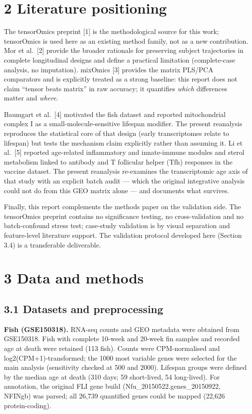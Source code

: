 \documentclass[
]{article}
\begin{document}
\section{2 Literature positioning}\label{literature-positioning}

The tensorOmics preprint {[}1{]} is the methodological source for this
work; tensorOmics is used here as an existing method family, not as a
new contribution. Mor et al.~{[}2{]} provide the broader rationale for
preserving subject trajectories in complete longitudinal designs and
define a practical limitation (complete-case analysis, no imputation).
mixOmics {[}3{]} provides the matrix PLS/PCA comparators and is
explicitly treated as a strong baseline: this report does not claim
``tensor beats matrix'' in raw accuracy; it quantifies \emph{which}
differences matter and \emph{where}.

Baumgart et al.~{[}4{]} motivated the fish dataset and reported
mitochondrial complex I as a small-molecule-sensitive lifespan modifier.
The present reanalysis reproduces the statistical core of that design
(early transcriptomes relate to lifespan) but tests the mechanism claim
explicitly rather than assuming it. Li et al.~{[}5{]} reported
age-related inflammatory and innate-immune modules and sterol metabolism
linked to antibody and T follicular helper (Tfh) responses in the
vaccine dataset. The present reanalysis re-examines the transcriptomic
age axis of that study with an explicit batch audit --- which the
original integrative analysis could not do from this GEO matrix alone
--- and documents what survives.

Finally, this report complements the methods paper on the validation
side. The tensorOmics preprint contains no significance testing, no
cross-validation and no batch-confound stress test; case-study
validation is by visual separation and feature-level literature support.
The validation protocol developed here (Section 3.4) is a transferable
deliverable.

\section{3 Data and methods}\label{data-and-methods}

\subsection{3.1 Datasets and
preprocessing}\label{datasets-and-preprocessing}

\textbf{Fish (GSE150318).} RNA-seq counts and GEO metadata were obtained
from GSE150318. Fish with complete 10-week and 20-week fin samples and
recorded age at death were retained (113 fish). Counts were
CPM-normalised and log2(CPM+1)-transformed; the 1000 most variable genes
were selected for the main analysis (sensitivity checked at 500 and
2000). Lifespan groups were defined by the median age at death (310
days; 59 short-lived, 54 long-lived). For annotation, the original FLI
gene build (Nfu\_20150522.genes\_20150922, NFINgb) was parsed; all
26,739 quantified genes could be mapped (22,626 protein-coding).
\end{document}

